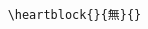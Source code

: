 \documentclass[letterpaper]{article}
\begin{document}
\vspace*{0.5cm}
\begin{multicols}{4}
	\RLmulticolcolumns
	
	\columnbreak
	
	
	\columnbreak
	
	
	\columnbreak
	
	
\end{multicols}

\begin{verbatim}

    \heartblock{}{無}{}
    
\end{verbatim}

\pagebreak



\vspace*{1cm}

\renewcommand{\kanji}{\centering\fontsize{55}{55}}
\vspace*{2cm}

\begin{multicols}{4}
	\RLmulticolcolumns
	
	\columnbreak
		
	\columnbreak

	\columnbreak
	

\end{multicols}
\end{document}
